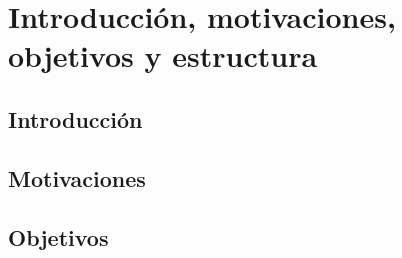 \chapter{Introducción, motivaciones, objetivos y estructura}
	\label{chap:one}
    
\section{Introducción}


\section{Motivaciones}


\section{Objetivos}

